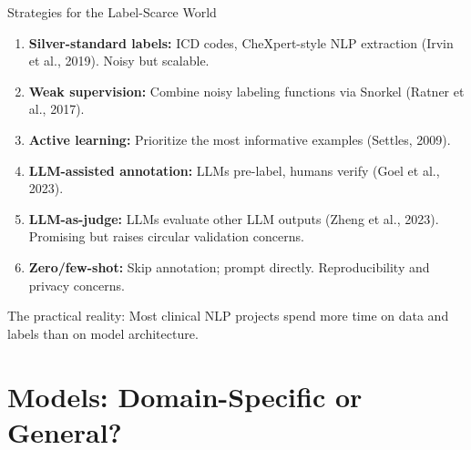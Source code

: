 \documentclass[aspectratio=169,11pt]{beamer}
\begin{document}
\begin{frame}{Strategies for the Label-Scarce World}
\small
\begin{enumerate}\setlength\itemsep{0.02em}
  \item \textbf{Silver-standard labels:} ICD codes, CheXpert-style NLP extraction (Irvin et al., 2019). Noisy but scalable.
  \item \textbf{Weak supervision:} Combine noisy labeling functions via Snorkel (Ratner et al., 2017).
  \item \textbf{Active learning:} Prioritize the most informative examples (Settles, 2009).
  \item \textbf{LLM-assisted annotation:} LLMs pre-label, humans verify (Goel et al., 2023).
  \item \textbf{LLM-as-judge:} LLMs evaluate other LLM outputs (Zheng et al., 2023). Promising but raises circular validation concerns.
  \item \textbf{Zero/few-shot:} Skip annotation; prompt directly. Reproducibility and privacy concerns.
\end{enumerate}

\vspace{0.1em}
\alert{The practical reality:} Most clinical NLP projects spend more time on data and labels than on model architecture.
\end{frame}

\section{Models: Domain-Specific or General?}
\end{document}
